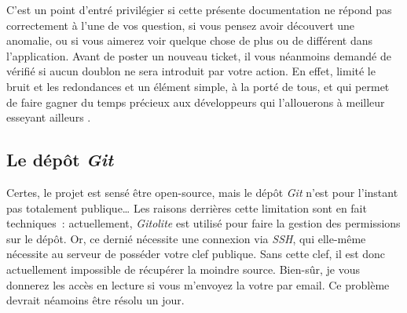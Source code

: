 C'est un point d'entré privilégier si cette présente documentation ne répond pas correctement à l'une de vos question, si vous pensez avoir découvert une anomalie, ou si vous aimerez voir quelque chose de plus ou de différent dans l'application.
Avant de poster un nouveau ticket, il vous néanmoins demandé de vérifié si aucun doublon ne sera introduit par votre action.
En effet, limité le bruit et les redondances et un élément simple, à la porté de tous, et qui permet de faire gagner du temps précieux aux développeurs qui l'allouerons à meilleur esseyant ailleurs \smiley.

\subsection{Le dépôt \emph{Git}}
Certes, le projet est sensé être open-source, mais le dépôt \emph{Git} n'est pour l'instant pas totalement publique\dots{}
Les raisons derrières cette limitation sont en fait techniques~: actuellement, \emph{Gitolite} est utilisé pour faire la gestion des permissions sur le dépôt.
Or, ce dernié nécessite une connexion via \emph{SSH}, qui elle-même nécessite au serveur de posséder votre clef publique.
Sans cette clef, il est donc actuellement impossible de récupérer la moindre source.
Bien-sûr, je vous donnerez les accès en lecture si vous m'envoyez la votre par email.
Ce problème devrait néamoins être résolu un jour.
